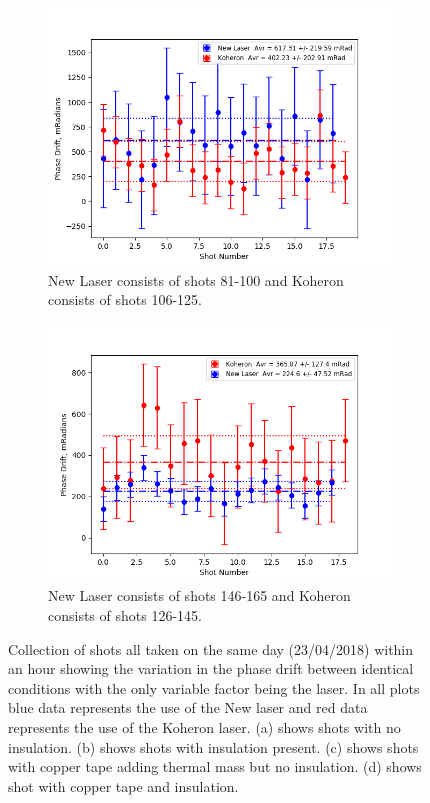 \documentclass[12pt,a4paper,oneside]{report}
\begin{document}
\begin{figure}[H]
  \begin{subfigure}{.5\textwidth}
    \centering\captionsetup{width=.9\linewidth}
    \includegraphics[width=\textwidth,angle=0]{DImages/Max_-_Min_Drift_for_Shots_5and_6.png}
    \caption{New Laser consists of shots 81-100 and Koheron consists of shots 106-125.}
  \end{subfigure}
  \begin{subfigure}{.5\textwidth}
    \centering\captionsetup{width=.9\linewidth}
    \includegraphics[width=\textwidth, angle=0]{DImages/Max_-_Min_Drift_for_Shots_7and_8.png}
    \caption{New Laser consists of shots 146-165 and Koheron consists of shots 126-145.}
  \end{subfigure}
\caption{Collection of shots all taken on the same day (23/04/2018) within an hour showing the variation in the phase drift between identical conditions with the only variable factor being the laser. In all plots blue data represents the use of the New laser and red data represents the use of the Koheron laser. (a) shows shots with no insulation. (b) shows shots with insulation present. (c) shows shots with copper tape adding thermal mass but no insulation. (d) shows shot with copper tape and insulation.}
\label{fig:4-max-min-drifts}
\end{figure}
\end{document}
